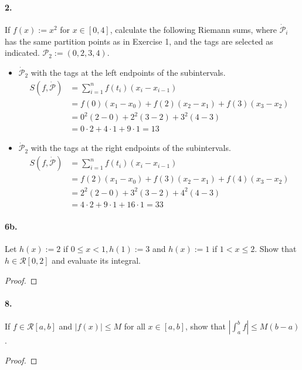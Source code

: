 \documentclass[12pt]{article}
\theoremstyle{remark}
\begin{document}
\paragraph{2.} If $f(x):=x^2$ for $x \in[0,4]$, calculate the following Riemann sums, where $\dot{\mathcal{P}}_i$ has the same partition points as in Exercise 1, and the tags are selected as indicated. $\mathcal{P}_2 := (0, 2, 3, 4)$.
\begin{itemize}
    \item $\dot{\mathcal{P}}_2$ with the tags at the left endpoints of the subintervals.
    \begin{align*} 
        S(f, \dot{\mathcal{P}}) &=\sum_{i=1}^n f\left(t_i\right)\left(x_i-x_{i-1}\right) \\
        &=f(0)\left(x_1-x_0\right)+f(2)\left(x_2-x_1\right)+f(3)\left(x_3-x_2\right) \\
        &=0^2(2-0)+2^2(3-2)+3^2(4-3) \\
        &=0 \cdot 2+4 \cdot 1+9 \cdot 1=13 
    \end{align*}
    \item $\dot{\mathcal{P}}_2$ with the tags at the right endpoints of the subintervals.
    \begin{align*}
        S(f, \dot{\mathcal{P}}) &=\sum_{i=1}^n f\left(t_i\right)\left(x_i-x_{i-1}\right) \\
        &=f(2)\left(x_1-x_0\right)+f(3)\left(x_2-x_1\right)+f(4)\left(x_3-x_2\right) \\
        &=2^2(2-0)+3^2(3-2)+4^2(4-3) \\
        &=4 \cdot 2+9 \cdot 1+16 \cdot 1=33
    \end{align*}
\end{itemize}

\paragraph{6b.} Let $h(x):=2$ if $0 \leq x<1, h(1):=3$ and $h(x):=1$ if $1<x \leq 2$. Show that $h \in \mathcal{R}[0,2]$ and evaluate its integral.
\begin{proof}

\end{proof}

\paragraph{8.} If $f \in \mathcal{R}[a, b]$ and $|f(x)| \leq M$ for all $x \in[a, b]$, show that $\left|\int_a^b f\right| \leq M(b-a)$.
\begin{proof}

\end{proof}
\end{document}
